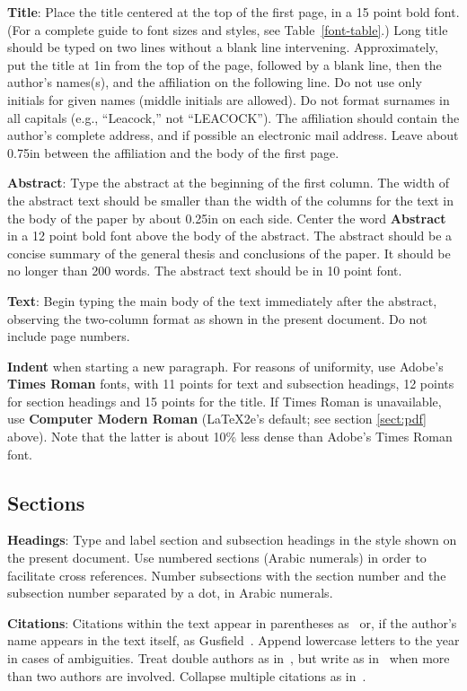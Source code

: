 \documentclass[11pt,letterpaper]{article}
\begin{document}
{\bf Title}: Place the title centered at the top of the first page, in
a 15 point bold font.  (For a complete guide to font sizes and styles, see Table~\ref{font-table}.)
Long title should be typed on two lines without
a blank line intervening. Approximately, put the title at 1in from the
top of the page, followed by a blank line, then the author's names(s),
and the affiliation on the following line.  Do not use only initials
for given names (middle initials are allowed). Do not format surnames
in all capitals (e.g., ``Leacock,'' not ``LEACOCK'').  The affiliation should
contain the author's complete address, and if possible an electronic
mail address. Leave about 0.75in between the affiliation and the body
of the first page.

{\bf Abstract}: Type the abstract at the beginning of the first
column.  The width of the abstract text should be smaller than the
width of the columns for the text in the body of the paper by about
0.25in on each side.  Center the word {\bf Abstract} in a 12 point
bold font above the body of the abstract. The abstract should be a
concise summary of the general thesis and conclusions of the paper.
It should be no longer than 200 words.  The abstract text should be in 10 point font.

{\bf Text}: Begin typing the main body of the text immediately after
the abstract, observing the two-column format as shown in 
the present document.  Do not include page numbers.

{\bf Indent} when starting a new paragraph. For reasons of uniformity,
use Adobe's {\bf Times Roman} fonts, with 11 points for text and 
subsection headings, 12 points for section headings and 15 points for
the title.  If Times Roman is unavailable, use {\bf Computer Modern
  Roman} (\LaTeX2e{}'s default; see section \ref{sect:pdf} above).
Note that the latter is about 10\% less dense than Adobe's Times Roman
font.

\subsection{Sections}

{\bf Headings}: Type and label section and subsection headings in the
style shown on the present document.  Use numbered sections (Arabic
numerals) in order to facilitate cross references. Number subsections
with the section number and the subsection number separated by a dot,
in Arabic numerals. 

{\bf Citations}: Citations within the text appear
in parentheses as~\cite{Gusfield:97} or, if the author's name appears in
the text itself, as Gusfield~. 
Append lowercase letters to the year in cases of ambiguities.  
Treat double authors as in~\cite{Aho:72}, but write as 
in~\cite{Chandra:81} when more than two authors are involved. 
Collapse multiple citations as in~\cite{Gusfield:97,Aho:72}.
\end{document}
